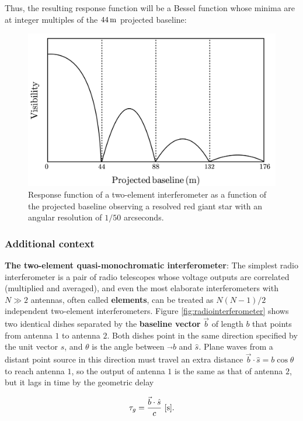 \documentclass[a4paper,10pt]{article}
\begin{document}
{\noindent}Thus, the resulting response function will be a Bessel function whose minima are at integer multiples of the $44\,{\rm m}$ projected baseline:

\begin{figure}[h]
    \centering
    \includegraphics[width=12cm]{figures/BesselVisibility.png}
    \caption{\footnotesize{Response function of a two-element interferometer as a function of the projected baseline observing a resolved red giant star with an angular resolution of $1/50$ arcseconds.}}
    \label{fig:besselvisibility}
\end{figure}

\subsubsection{Additional context}

{\noindent}\textbf{The two-element quasi-monochromatic interferometer}: The simplest radio interferometer is a pair of radio telescopes whose voltage outputs are correlated (multiplied and averaged), and even the most elaborate interferometers with $N\gg2$ antennas, often called \textbf{elements}, can be treated as $N(N-1)/2$ independent two-element interferometers. Figure \ref{fig:radiointerferometer} shows two identical dishes separated by the \textbf{baseline vector} $\vec{b}$ of length $b$ that points from antenna $1$ to antenna $2$. Both dishes point in the same direction specified by the unit vector $\hat{s}$, and $\theta$ is the angle between $\vec{}b$ and $\hat{s}$. Plane waves from a distant point source in this direction must travel an extra distance $\vec{b}\cdot\hat{s}=b\cos\theta$ to reach antenna $1$, so the output of antenna $1$ is the same as that of antenna $2$, but it lags in time by the geometric delay

\begin{align*}
    \tau_g = \frac{\vec{b}\cdot\hat{s}}{c} ~ [{\rm s}].
\end{align*}
\end{document}
